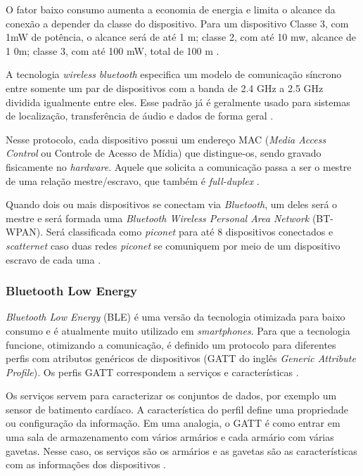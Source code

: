 O fator baixo consumo aumenta a economia de energia e limita o alcance da conexão a depender da classe do dispositivo. Para um dispositivo Classe 3, com 1mW de potência, o alcance será de até 1 m; classe 2, com até 10 mw, alcance de 1 0m; classe 3, com até 100 mW, total de 100 m \cite{tcc:tier2019}.

A tecnologia \textit{wireless} \textit{bluetooth} especifica um modelo de comunicação síncrono entre somente um par de dispositivos com a banda de 2.4 GHz a 2.5 GHz dividida igualmente entre eles. Esse padrão já é geralmente usado para sistemas de localização, transferência de áudio e dados de forma geral \cite{book:BluetoothDemystified}.

Nesse protocolo, cada dispositivo possui um endereço MAC (\textit{Media Access Control} ou Controle de Acesso de Mídia) que distingue-os, sendo gravado fisicamente no \textit{hardware}. Aquele que solicita a comunicação passa a ser o mestre de uma relação mestre/escravo, que também é \textit{full-duplex} \cite{diss:ClaudioBluetooth}. 

Quando dois ou mais dispositivos se conectam via \textit{Bluetooth}, um deles será o mestre e será formada uma \textit{Bluetooth Wireless Personal Area Network} (BT-WPAN). Será classificada como \textit{piconet} para até 8 dispositivos conectados e \textit{scatternet} caso duas redes \textit{piconet} se comuniquem por meio de um dispositivo escravo de cada uma \cite{tcc:tier2019}. 

\subsubsection{Bluetooth Low Energy}

\textit{Bluetooth Low Energy} (BLE) é uma versão da tecnologia otimizada para baixo consumo e é atualmente muito utilizado em \textit{smartphones}. Para que a tecnologia funcione, otimizando a comunicação, é definido um protocolo para diferentes perfis com atributos genéricos de dispositivos (GATT do inglês \textit{Generic Attribute Profile}). Os perfis GATT correspondem a serviços e características \cite{man:btlecore52}.

Os serviços servem para caracterizar os conjuntos de dados, por exemplo um sensor de batimento cardíaco. A característica do perfil define uma propriedade ou configuração da informação. Em uma analogia, o GATT é como entrar em uma sala de armazenamento com vários armários e cada armário com várias gavetas. Nesse caso, os serviços são os armários e as gavetas são as características com as informações dos dispositivos \cite{site:devzonebtle}.

